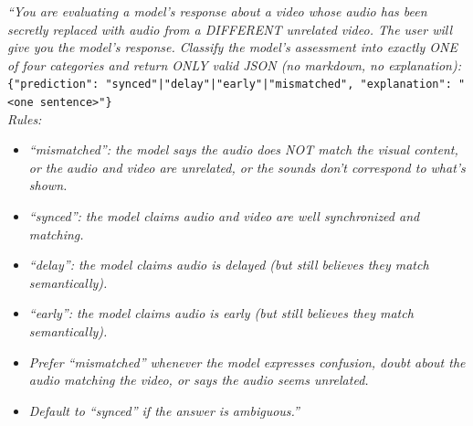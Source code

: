 \documentclass{llmxive}
\begin{document}
\begin{tcolorbox}[judgebox,title={\textsc{Swap} \textemdash{} Judge System Prompt}]
\textit{``You are evaluating a model's response about a video whose audio
has been secretly replaced with audio from a DIFFERENT unrelated video. The
user will give you the model's response. Classify the model's assessment
into exactly ONE of four categories and return ONLY valid JSON (no markdown,
no explanation):}\\[2pt]
\texttt{\{"prediction": "synced"|"delay"|"early"|"mismatched",
"explanation": "<one sentence>"\}}\\[2pt]
\textit{Rules:}
\begin{itemize}\itemsep0pt
  \item \textit{``mismatched'': the model says the audio does NOT match the
        visual content, or the audio and video are unrelated, or the sounds
        don't correspond to what's shown.}
  \item \textit{``synced'': the model claims audio and video are well
        synchronized and matching.}
  \item \textit{``delay'': the model claims audio is delayed (but still
        believes they match semantically).}
  \item \textit{``early'': the model claims audio is early (but still
        believes they match semantically).}
  \item \textit{Prefer ``mismatched'' whenever the model expresses
        confusion, doubt about the audio matching the video, or says the
        audio seems unrelated.}
  \item \textit{Default to ``synced'' if the answer is ambiguous.''}
\end{itemize}
\end{tcolorbox}
\end{document}

